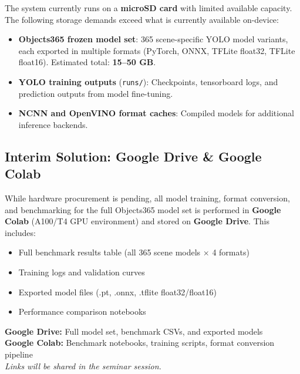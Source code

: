 \documentclass[12pt,a4paper]{article}
\begin{document}
\begin{warnbox}
The system currently runs on a \textbf{microSD card} with limited available
capacity. The following storage demands exceed what is currently available
on-device:

\begin{itemize}[leftmargin=*]
  \item \textbf{Objects365 frozen model set}: 365 scene-specific YOLO model
        variants, each exported in multiple formats (PyTorch, ONNX, TFLite
        float32, TFLite float16). Estimated total: \textbf{15--50 GB}.
  \item \textbf{YOLO training outputs} (\texttt{runs/}): Checkpoints,
        tensorboard logs, and prediction outputs from model fine-tuning.
  \item \textbf{NCNN and OpenVINO format caches}: Compiled models for
        additional inference backends.
\end{itemize}
\end{warnbox}

\subsection{Interim Solution: Google Drive \& Google Colab}
\label{sec:results_location}

While hardware procurement is pending, all model training, format conversion,
and benchmarking for the full Objects365 model set is performed in
\textbf{Google Colab} (A100/T4 GPU environment) and stored on
\textbf{Google Drive}. This includes:

\begin{itemize}[leftmargin=*]
  \item Full benchmark results table (all 365 scene models $\times$ 4 formats)
  \item Training logs and validation curves
  \item Exported model files (.pt, .onnx, .tflite float32/float16)
  \item Performance comparison notebooks
\end{itemize}

\begin{infobox}
  \textbf{Google Drive:} Full model set, benchmark CSVs, and exported models\\
  \textbf{Google Colab:} Benchmark notebooks, training scripts, format
  conversion pipeline
  \\[0.4em]
  \textit{Links will be shared in the seminar session.}
\end{infobox}
\end{document}
